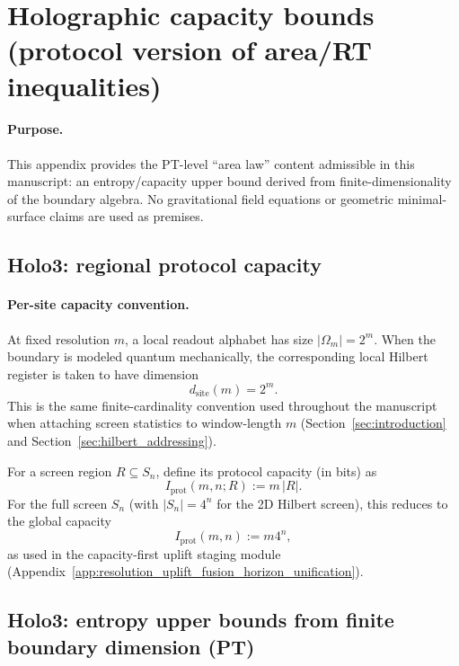 \section{Holographic capacity bounds (protocol version of area/RT inequalities)}
\label{app:holo_capacity_bound}

\paragraph{Purpose.}
\AuditTag This appendix provides the PT-level ``area law'' content admissible in this manuscript:
an entropy/capacity upper bound derived from finite-dimensionality of the boundary algebra.
No gravitational field equations or geometric minimal-surface claims are used as premises.

\subsection{Holo3: regional protocol capacity}
\label{subsec:holo3_regional_capacity}

\paragraph{Per-site capacity convention.}
\InterfaceTag At fixed resolution $m$, a local readout alphabet has size $|\Omega_m|=2^m$.
When the boundary is modeled quantum mechanically, the corresponding local Hilbert register is taken to have dimension
\[
d_{\mathrm{site}}(m)=2^m.
\]
This is the same finite-cardinality convention used throughout the manuscript when attaching screen statistics
to window-length $m$ (Section~\ref{sec:introduction} and Section~\ref{sec:hilbert_addressing}).

\begin{definition}
\label{def:regional_protocol_capacity}
\InterfaceTag For a screen region $R\subseteq S_n$, define its protocol capacity (in bits) as
\[
I_{\mathrm{prot}}(m,n;R):=m\,|R|.
\]
For the full screen $S_n$ (with $|S_n|=4^n$ for the 2D Hilbert screen), this reduces to the global capacity
\[
I_{\mathrm{prot}}(m,n):=m4^n,
\]
as used in the capacity-first uplift staging module (Appendix~\ref{app:resolution_uplift_fusion_horizon_unification}).
\end{definition}

\subsection{Holo3: entropy upper bounds from finite boundary dimension (PT)}
\label{subsec:holo3_entropy_bounds}

